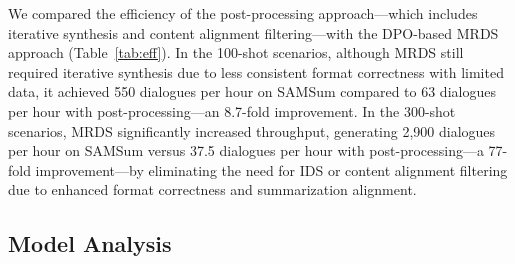 We compared the efficiency of the post-processing approach—which includes iterative synthesis and content alignment filtering—with the DPO-based MRDS approach (Table~\ref{tab:eff}). In the 100-shot scenarios, although MRDS still required iterative synthesis due to less consistent format correctness with limited data, it achieved 550 dialogues per hour on SAMSum compared to 63 dialogues per hour with post-processing—an 8.7-fold improvement. In the 300-shot scenarios, MRDS significantly increased throughput, generating 2,900 dialogues per hour on SAMSum versus 37.5 dialogues per hour with post-processing—a 77-fold improvement—by eliminating the need for IDS or content alignment filtering due to enhanced format correctness and summarization alignment.









\subsection{Model Analysis}


